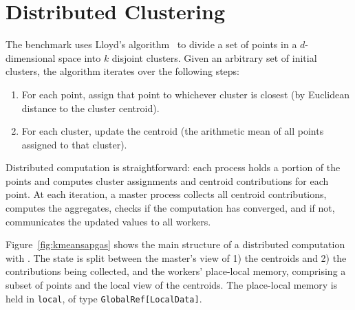 \section{Distributed \kmeans Clustering}
\label{sec:kmeans}

The \kmeans benchmark uses Lloyd's algorithm~\cite{Lloyd1982Least} to divide a
set of points in a $d$-dimensional space into $k$ disjoint clusters.  Given an
arbitrary set of initial clusters, the algorithm iterates over the following
steps:
\begin{enumerate}
  \item For each point, assign that point to whichever cluster is closest (by
Euclidean distance to the cluster centroid).
  \item For each cluster, update the centroid (the arithmetic mean of all
points assigned to that cluster).
\end{enumerate}
Distributed computation is straightforward: each process holds a portion of the
points and computes cluster assignments and centroid contributions for each
point. At each iteration, a master process collects all centroid contributions,
computes the aggregates, checks if the computation has converged, and if not,
communicates the updated values to all workers.

Figure~\ref{fig:kmeansapgas} shows the main structure of a distributed \kmeans
computation with \apgas. The state is split between the master's view of 1) the
centroids and 2) the contributions being collected, and the workers'
place-local memory, comprising a subset of points and the local view of the
centroids. The place-local memory is held in \lstinline{local}, of type
\lstinline{GlobalRef[LocalData]}.

